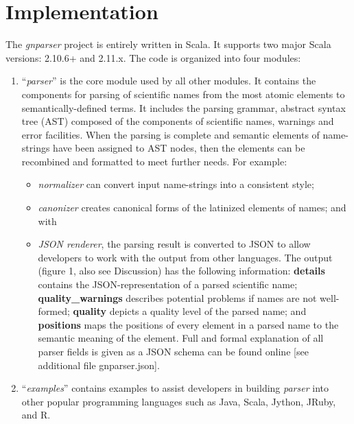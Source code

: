 \documentclass{bmcart}
\begin{document}
\section*{Implementation}

The \textit{gnparser} project is entirely written in Scala. It supports two
major Scala versions: 2.10.6+ and 2.11.x. The code is organized into four
modules:

\begin{enumerate}

  \item ``\textit{parser}'' is the core module used by all other modules. It
    contains the components for parsing of scientific names from the most atomic elements to semantically-defined terms. It includes the parsing
    grammar, abstract syntax tree (AST) composed of the components of scientific names, warnings and error facilities.  When the
    parsing is complete and semantic elements of name-strings have been assigned to AST nodes, 
    then the elements can be recombined and formatted to meet further needs.  For
    example:

\begin{itemize}

  \item \textit{normalizer} can convert input name-strings into a consistent style;

  \item \textit{canonizer} creates canonical forms of the latinized elements of names; and with

  \item \textit{JSON renderer}, the parsing result is converted to JSON
    \cite{bray2014javascript} to allow developers to work with the output from other languages. The output (figure 1, also see Discussion) has the following information: \textbf{details} contains the JSON-representation of a parsed scientific name; \textbf{quality\_warnings} describes potential problems if names are not well-formed; \textbf{quality} depicts a quality level of the parsed name;  and \textbf{positions} maps the positions of every element in a parsed name to the semantic meaning of the element. Full and formal explanation of all parser fields is given as a JSON schema
can be found online \cite{gnparser-json} [see additional file gnparser.json].

\end{itemize}

  \item ``\textit{examples}'' contains examples to assist developers in
    building \textit{parser} into other popular programming languages such as Java,
    Scala, Jython, JRuby, and R.


\end{enumerate}
\end{document}

